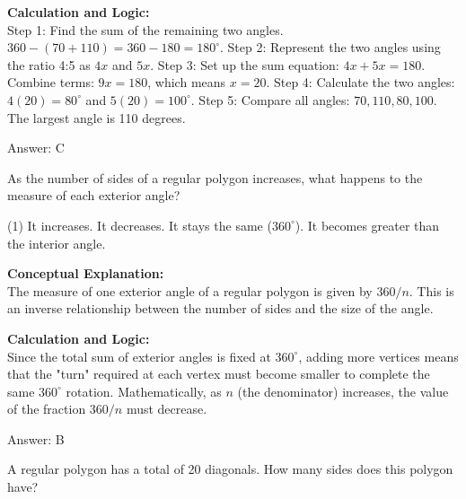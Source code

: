 \documentclass[11pt,paper=a4,answers]{exam}
\begin{document}
\begin{questions}
\begin{solution}
\textbf{Calculation and Logic:} \\
Step 1: Find the sum of the remaining two angles. $360 - (70 + 110) = 360 - 180 = 180^\circ$. Step 2: Represent the two angles using the ratio 4:5 as $4x$ and $5x$. Step 3: Set up the sum equation: $4x + 5x = 180$. Combine terms: $9x = 180$, which means $x = 20$. Step 4: Calculate the two angles: $4(20) = 80^\circ$ and $5(20) = 100^\circ$. Step 5: Compare all angles: $70, 110, 80, 100$. The largest angle is 110 degrees.

\vspace{30pt}

Answer: \colorbox{yellow!100}{C}
\end{solution}

\vspace{60pt}

\question
As the number of sides of a regular polygon increases, what happens to the measure of each exterior angle?
\begin{tasks}(1)
    \task It increases.
    \task It decreases.
    \task It stays the same ($360^\circ$).
    \task It becomes greater than the interior angle.
    \end{tasks}

\begin{solution}
\textbf{Conceptual Explanation:} \\
The measure of one exterior angle of a regular polygon is given by $360 / n$. This is an inverse relationship between the number of sides and the size of the angle.

\vspace{30pt}

\textbf{Calculation and Logic:} \\
Since the total sum of exterior angles is fixed at $360^\circ$, adding more vertices means that the "turn" required at each vertex must become smaller to complete the same $360^\circ$ rotation. Mathematically, as $n$ (the denominator) increases, the value of the fraction $360/n$ must decrease.

\vspace{30pt}

Answer: \colorbox{yellow!100}{B}
\end{solution}

\vspace{60pt}

\question
A regular polygon has a total of 20 diagonals. How many sides does this polygon have?


\end{questions}
\end{document}
